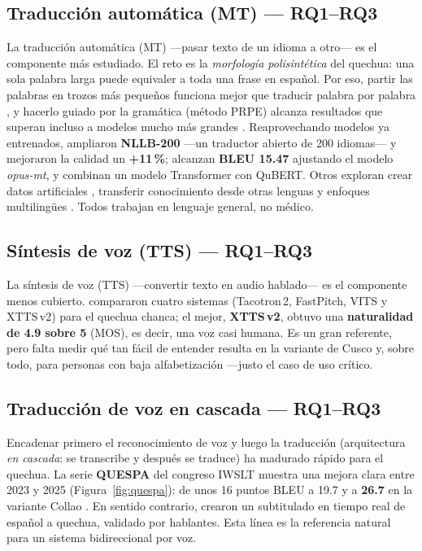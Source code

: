 \documentclass[10pt,twocolumn,a4paper]{article}
\begin{document}
\subsection*{Traducci\'on autom\'atica (MT) --- RQ1--RQ3}
La traducci\'on autom\'atica (MT) ---pasar texto de un idioma a otro--- es el componente m\'as estudiado. El reto es la \emph{morfolog\'ia polisint\'etica} del quechua: una sola palabra larga puede equivaler a toda una frase en espa\~nol. Por eso, partir las palabras en trozos m\'as peque\~nos funciona mejor que traducir palabra por palabra \parencite{ortega2020quechua}, y hacerlo guiado por la gram\'atica (m\'etodo PRPE) alcanza resultados que superan incluso a modelos mucho m\'as grandes \parencite{Chen202120}. Reaprovechando modelos ya entrenados, \textcite{Gow-Smith2023192} ampliaron \textbf{NLLB-200} ---un traductor abierto de 200 idiomas--- y mejoraron la calidad un \textbf{+11\,\%}; \textcite{Barbaran2026464} alcanzan \textbf{BLEU 15.47} ajustando el modelo \emph{opus-mt}, y \textcite{CuevaMedina2024} combinan un modelo Transformer con QuBERT. Otros exploran crear datos artificiales \parencite{Dhawan2026119,Ebrahimi2024236}, transferir conocimiento desde otras lenguas \parencite{Ahmed2023156} y enfoques multiling\"ues \parencite{Veliz2021241,Oncevay2021194}. Todos trabajan en lenguaje general, no m\'edico.

\subsection*{S\'intesis de voz (TTS) --- RQ1--RQ3}
La s\'intesis de voz (TTS) ---convertir texto en audio hablado--- es el componente menos cubierto. \textcite{HuamanCuro2026} compararon cuatro sistemas (Tacotron\,2, FastPitch, VITS y XTTS\,v2) para el quechua chanca; el mejor, \textbf{XTTS\,v2}, obtuvo una \textbf{naturalidad de 4.9 sobre 5} (MOS), es decir, una voz casi humana. Es un gran referente, pero falta medir qu\'e tan f\'acil de entender resulta en la variante de Cusco y, sobre todo, para personas con baja alfabetizaci\'on ---justo el caso de uso cr\'itico.

\subsection*{Traducci\'on de voz en cascada --- RQ1--RQ3}
Encadenar primero el reconocimiento de voz y luego la traducci\'on (arquitectura \emph{en cascada}: se transcribe y despu\'es se traduce) ha madurado r\'apido para el quechua. La serie \textbf{QUESPA} del congreso IWSLT muestra una mejora clara entre 2023 y 2025 (Figura~\ref{fig:quespa}): de unos 16 puntos BLEU \parencite{Ortega2023261} a 19.7 \parencite{Ortega2024173} y a \textbf{26.7} en la variante Collao \parencite{Ortega2025260}. En sentido contrario, \textcite{Alvarez-Crespo2023837} crearon un subtitulado en tiempo real de espa\~nol a quechua, validado por hablantes. Esta l\'inea es la referencia natural para un sistema bidireccional por voz.
\end{document}
